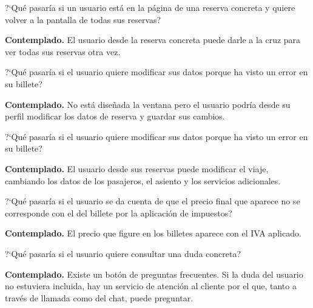 \begin{escenario}
    \centering
    ?`Qué pasaría si un usuario está en la página de una reserva concreta y quiere volver a la pantalla de todas sus reservas?

    \begin{solucion}
        \centering
        \textbf{Contemplado.} El usuario desde la reserva concreta puede darle a la cruz para ver todas sus reservas otra vez.
    \end{solucion}
\end{escenario}

\begin{escenario}
    \centering
    ?`Qué pasaría si el usuario quiere modificar sus datos porque ha visto un error en su billete?

    \begin{solucion}
        \centering
        \textbf{Contemplado.} No está diseñada la ventana pero el usuario podría desde su perfil modificar los datos de reserva y guardar sus cambios.
    \end{solucion}
\end{escenario}

\begin{escenario}
    \centering
    ?`Qué pasaría si el usuario quiere modificar sus datos porque ha visto un error en su billete?

    \begin{solucion}
        \centering
        \textbf{Contemplado.} El usuario desde sus reservas puede modificar el viaje, cambiando los datos de los pasajeros, el asiento y los servicios adicionales.
    \end{solucion}
\end{escenario}

\begin{escenario}
    \centering
    ?`Qué pasaría si el usuario se da cuenta de que el precio final que aparece no se corresponde con el del billete por la aplicación de impuestos?

    \begin{solucion}
        \centering
        \textbf{Contemplado.} El precio que figure en los billetes aparece con el IVA aplicado.
    \end{solucion}
\end{escenario}

\begin{escenario}
    \centering
    ?`Qué pasaría si el usuario quiere consultar una duda concreta?

    \begin{solucion}
        \centering
        \textbf{Contemplado.} Existe un botón de preguntas frecuentes. Si la duda del usuario no estuviera incluida, hay un servicio de atención al cliente por el que, tanto a través de llamada como del chat, puede preguntar.
    \end{solucion}
\end{escenario}

